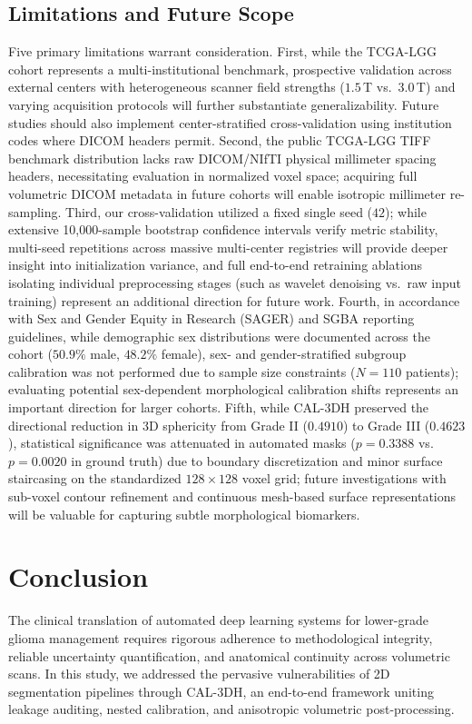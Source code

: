 \documentclass[preprint,12pt,authoryear]{elsarticle}
\begin{document}
\subsection{Limitations and Future Scope}
Five primary limitations warrant consideration. First, while the TCGA-LGG cohort represents a multi-institutional benchmark, prospective validation across external centers with heterogeneous scanner field strengths ($1.5$\,T vs.\ $3.0$\,T) and varying acquisition protocols will further substantiate generalizability. Future studies should also implement center-stratified cross-validation using institution codes where DICOM headers permit. Second, the public TCGA-LGG TIFF benchmark distribution lacks raw DICOM/NIfTI physical millimeter spacing headers, necessitating evaluation in normalized voxel space; acquiring full volumetric DICOM metadata in future cohorts will enable isotropic millimeter re-sampling. Third, our cross-validation utilized a fixed single seed ($42$); while extensive 10,000-sample bootstrap confidence intervals verify metric stability, multi-seed repetitions across massive multi-center registries will provide deeper insight into initialization variance, and full end-to-end retraining ablations isolating individual preprocessing stages (such as wavelet denoising vs.\ raw input training) represent an additional direction for future work. Fourth, in accordance with Sex and Gender Equity in Research (SAGER) and SGBA reporting guidelines, while demographic sex distributions were documented across the cohort ($50.9\%$ male, $48.2\%$ female), sex- and gender-stratified subgroup calibration was not performed due to sample size constraints ($N=110$ patients); evaluating potential sex-dependent morphological calibration shifts represents an important direction for larger cohorts. Fifth, while CAL-3DH preserved the directional reduction in 3D sphericity from Grade II ($0.4910$) to Grade III ($0.4623$), statistical significance was attenuated in automated masks ($p = 0.3388$ vs.\ $p = 0.0020$ in ground truth) due to boundary discretization and minor surface staircasing on the standardized $128 \times 128$ voxel grid; future investigations with sub-voxel contour refinement and continuous mesh-based surface representations will be valuable for capturing subtle morphological biomarkers.

\section{Conclusion}
\label{sec:conclusion}
The clinical translation of automated deep learning systems for lower-grade glioma management requires rigorous adherence to methodological integrity, reliable uncertainty quantification, and anatomical continuity across volumetric scans. In this study, we addressed the pervasive vulnerabilities of 2D segmentation pipelines through CAL-3DH, an end-to-end framework uniting leakage auditing, nested calibration, and anisotropic volumetric post-processing.
\end{document}
